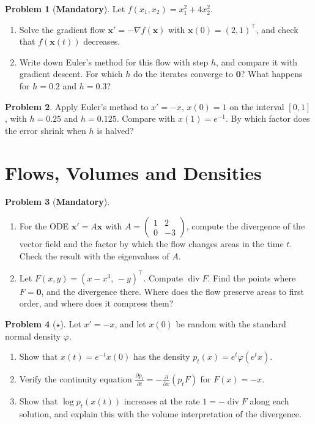 \documentclass[11pt]{article}
\theoremstyle{definition}
\newtheorem{problem}{Problem}[section]
\newcommand{\mandatory}{\textcolor{red!70!black}{\textbf{Mandatory}}}
\DeclareMathOperator{\Div}{div}
\begin{document}
\begin{problem}[\mandatory]\label{pr:gradient-flow}
    Let $f(x_1, x_2) = x_1^2 + 4x_2^2$.
    \begin{enumerate}[label=(\alph*)]
        \item Solve the gradient flow $\mathbf{x}' = -\nabla f(\mathbf{x})$ with $\mathbf{x}(0) = (2, 1)^\top$, and check that $f(\mathbf{x}(t))$ decreases.
        \item Write down Euler's method for this flow with step $h$, and compare it with gradient descent. For which $h$ do the iterates converge to $\mathbf{0}$? What happens for $h = 0.2$ and $h = 0.3$?
    \end{enumerate}
\end{problem}

\begin{problem}\label{pr:euler-error}
    Apply Euler's method to $x' = -x$, $x(0) = 1$ on the interval $[0, 1]$, with $h = 0.25$ and $h = 0.125$. Compare with $x(1) = e^{-1}$. By which factor does the error shrink when $h$ is halved?
\end{problem}

\section{Flows, Volumes and Densities}

\begin{problem}[\mandatory]\label{pr:volume-flow}
    \begin{enumerate}[label=(\alph*)]
        \item For the ODE $\mathbf{x}' = A\mathbf{x}$ with $A = \begin{pmatrix} 1 & 2 \\ 0 & -3 \end{pmatrix}$, compute the divergence of the vector field and the factor by which the flow changes areas in the time $t$. Check the result with the eigenvalues of $A$.
        \item Let $F(x, y) = (x - x^3, \, -y)^\top$. Compute $\Div F$. Find the points where $F = \mathbf{0}$, and the divergence there. Where does the flow preserve areas to first order, and where does it compress them?
    \end{enumerate}
\end{problem}

\begin{problem}[$\star$]\label{pr:continuity-1d}
    Let $x' = -x$, and let $x(0)$ be random with the standard normal density $\varphi$.
    \begin{enumerate}[label=(\alph*)]
        \item Show that $x(t) = e^{-t}x(0)$ has the density $p_t(x) = e^t\varphi(e^tx)$.
        \item Verify the continuity equation $\frac{\partial p_t}{\partial t} = -\frac{\partial}{\partial x}(p_tF)$ for $F(x) = -x$.
        \item Show that $\log p_t(x(t))$ increases at the rate $1 = -\Div F$ along each solution, and explain this with the volume interpretation of the divergence.
    \end{enumerate}
\end{problem}
\end{document}
